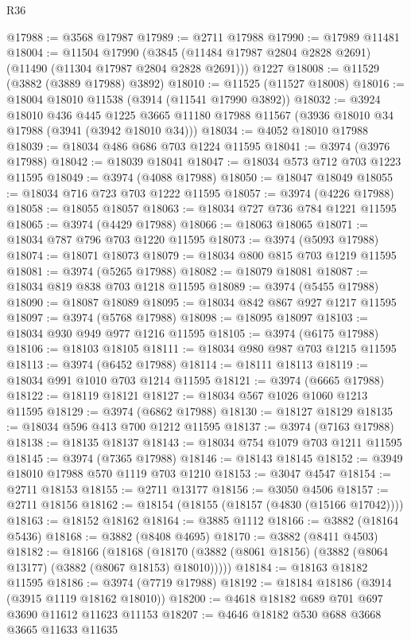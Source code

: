 \begin{lexlean}{R36}
\begin{coremodule}
@17988 := @3568 @17987
@17989 := @2711 @17988
@17990 := @17989 @11481
@18004 := @11504
    @17990
    (@3845 (@11484 @17987 @2804 @2828 @2691) (@11490 (@11304 @17987 @2804 @2828 @2691)))
    @1227
@18008 := @11529 (@3882 (@3889 @17988) @3892)
@18010 := @11525 (@11527 @18008)
@18016 := @18004 @18010 @11538 (@3914 (@11541 @17990 @3892))
@18032 := @3924
    @18010
    @436
    @445
    @1225
    @3665
    @11180
    @17988
    @11567
    (@3936 @18010 @34 @17988 (@3941 (@3942 @18010 @34)))
@18034 := @4052 @18010 @17988
@18039 := @18034 @486 @686 @703 @1224 @11595
@18041 := @3974 (@3976 @17988)
@18042 := @18039 @18041
@18047 := @18034 @573 @712 @703 @1223 @11595
@18049 := @3974 (@4088 @17988)
@18050 := @18047 @18049
@18055 := @18034 @716 @723 @703 @1222 @11595
@18057 := @3974 (@4226 @17988)
@18058 := @18055 @18057
@18063 := @18034 @727 @736 @784 @1221 @11595
@18065 := @3974 (@4429 @17988)
@18066 := @18063 @18065
@18071 := @18034 @787 @796 @703 @1220 @11595
@18073 := @3974 (@5093 @17988)
@18074 := @18071 @18073
@18079 := @18034 @800 @815 @703 @1219 @11595
@18081 := @3974 (@5265 @17988)
@18082 := @18079 @18081
@18087 := @18034 @819 @838 @703 @1218 @11595
@18089 := @3974 (@5455 @17988)
@18090 := @18087 @18089
@18095 := @18034 @842 @867 @927 @1217 @11595
@18097 := @3974 (@5768 @17988)
@18098 := @18095 @18097
@18103 := @18034 @930 @949 @977 @1216 @11595
@18105 := @3974 (@6175 @17988)
@18106 := @18103 @18105
@18111 := @18034 @980 @987 @703 @1215 @11595
@18113 := @3974 (@6452 @17988)
@18114 := @18111 @18113
@18119 := @18034 @991 @1010 @703 @1214 @11595
@18121 := @3974 (@6665 @17988)
@18122 := @18119 @18121
@18127 := @18034 @567 @1026 @1060 @1213 @11595
@18129 := @3974 (@6862 @17988)
@18130 := @18127 @18129
@18135 := @18034 @596 @413 @700 @1212 @11595
@18137 := @3974 (@7163 @17988)
@18138 := @18135 @18137
@18143 := @18034 @754 @1079 @703 @1211 @11595
@18145 := @3974 (@7365 @17988)
@18146 := @18143 @18145
@18152 := @3949 @18010 @17988 @570 @1119 @703 @1210
@18153 := @3047 @4547
@18154 := @2711 @18153
@18155 := @2711 @13177
@18156 := @3050 @4506
@18157 := @2711 @18156
@18162 := @18154 (@18155 (@18157 (@4830 (@15166 @17042))))
@18163 := @18152 @18162
@18164 := @3885 @1112
@18166 := @3882 (@18164 @5436)
@18168 := @3882 (@8408 @4695)
@18170 := @3882 (@8411 @4503)
@18182 := @18166
    (@18168 (@18170 (@3882 (@8061 @18156) (@3882 (@8064 @13177) (@3882 (@8067 @18153) @18010)))))
@18184 := @18163 @18182 @11595
@18186 := @3974 (@7719 @17988)
@18192 := @18184 @18186 (@3914 (@3915 @1119 @18162 @18010))
@18200 := @4618 @18182 @689 @701 @697 @3690 @11612 @11623 @11153
@18207 := @4646 @18182 @530 @688 @3668 @3665 @11633 @11635

\end{coremodule}
\end{lexlean}
